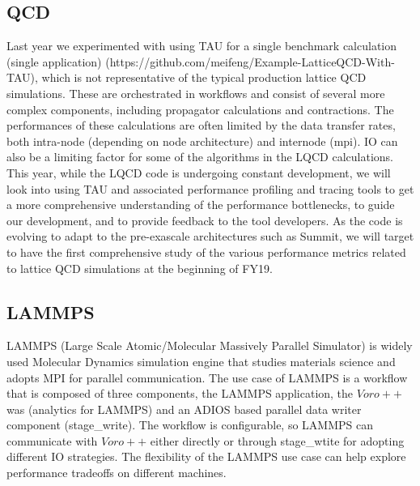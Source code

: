 \subsection{QCD}
Last year we experimented with using TAU for a single benchmark calculation (single application) (https://github.com/meifeng/Example-LatticeQCD-With-TAU), which is not representative of the typical production lattice QCD simulations.  These are orchestrated in workflows and consist of several more complex components, including propagator calculations and contractions. The performances of these calculations are often limited by the data transfer rates, both intra-node (depending on node architecture) and internode (mpi). IO can also be a limiting factor for some of the algorithms in the LQCD calculations. This year, while the LQCD code is undergoing constant development, we will look into using TAU and associated performance profiling and tracing tools to get a more comprehensive understanding of the performance bottlenecks, to guide our development, and to provide feedback to the tool developers. As the code is evolving to adapt to the pre-exascale architectures such as Summit, we will target to have the first comprehensive study of the various performance metrics related to lattice QCD simulations at the beginning of FY19. 

\subsection {LAMMPS}

LAMMPS (Large Scale Atomic/Molecular Massively Parallel Simulator)  is widely used Molecular Dynamics simulation engine that studies materials science and adopts MPI for parallel communication. The use case of LAMMPS is a workflow that is composed of three components, the LAMMPS application, the $Voro++$ was (analytics for LAMMPS) and an ADIOS based parallel data writer component (stage\_write). The workflow is configurable, so LAMMPS can communicate with $Voro++$ either directly or through stage\_wtite for adopting different IO strategies. The flexibility of the LAMMPS use case can help explore performance tradeoffs on different machines.

